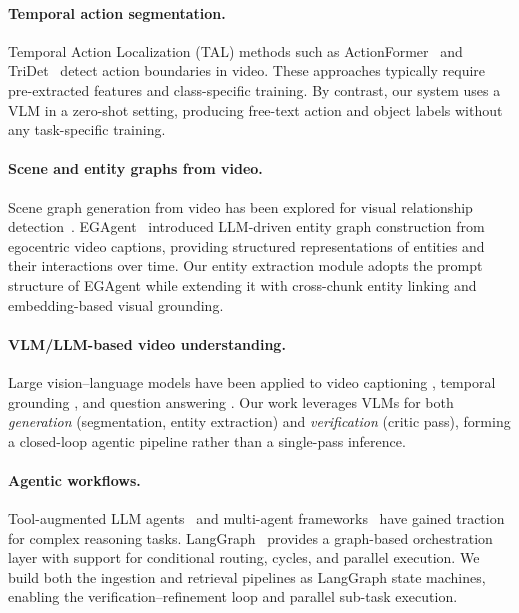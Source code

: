 \documentclass[10pt,twocolumn]{article}
\begin{document}
\paragraph{Temporal action segmentation.}
Temporal Action Localization (TAL) methods such as
ActionFormer~\cite{zhang2022actionformer} and
TriDet~\cite{shi2023tridet} detect action boundaries in video.
These approaches typically require pre-extracted features and
class-specific training.
By contrast, our system uses a VLM in a zero-shot setting,
producing free-text action and object labels without any
task-specific training.

\paragraph{Scene and entity graphs from video.}
Scene graph generation from video has been explored for visual
relationship detection~\cite{ji2020action,cong2021spatial}.
EGAgent~\cite{xu2025egagent} introduced LLM-driven entity graph
construction from egocentric video captions, providing structured
representations of entities and their interactions over time.
Our entity extraction module adopts the prompt structure of
EGAgent while extending it with cross-chunk entity linking and
embedding-based visual grounding.

\paragraph{VLM/LLM-based video understanding.}
Large vision--language models have been applied to video captioning
\cite{li2023videochat,lin2023video}, temporal grounding
\cite{lei2021detecting}, and question answering
\cite{xu2017video}.
Our work leverages VLMs for both \emph{generation}
(segmentation, entity extraction) and \emph{verification}
(critic pass), forming a closed-loop agentic pipeline rather than
a single-pass inference.

\paragraph{Agentic workflows.}
Tool-augmented LLM agents~\cite{schick2023toolformer,yao2023react}
and multi-agent frameworks~\cite{wu2023autogen} have gained
traction for complex reasoning tasks.
LangGraph~\cite{langgraph2024} provides a graph-based orchestration
layer with support for conditional routing, cycles, and parallel
execution.  We build both the ingestion and retrieval pipelines
as LangGraph state machines, enabling the verification--refinement
loop and parallel sub-task execution.
\end{document}
